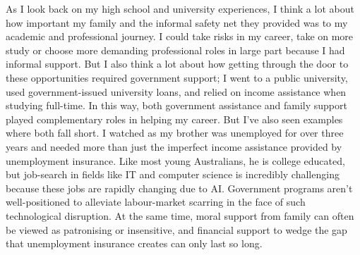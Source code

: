 As I look back on my high school and university experiences, I think a lot about how important my family and the informal safety net they provided was to my academic and professional journey. I could take risks in my career, take on more study or choose more demanding professional roles in large part because I had informal support. But I also think a lot about how getting through the door to these opportunities required government support; I went to a public university, used government-issued university loans, and relied on income assistance when studying full-time. In this way, both government assistance and family support played complementary roles in helping my career. But I've also seen examples where both fall short. I watched as my brother was unemployed for over three years and needed more than just the imperfect income assistance provided by unemployment insurance. Like most young Australians, he is college educated, but job-search in fields like IT and computer science is incredibly challenging because these jobs are rapidly changing due to AI. Government programs aren't well-positioned to alleviate labour-market scarring in the face of such technological disruption. At the same time, moral support from family can often be viewed as patronising or insensitive, and financial support to wedge the gap that unemployment insurance creates can only last so long.

